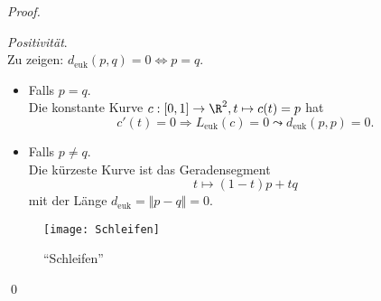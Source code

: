 \begin{theorem}
\begin{proof}
\begin{itemize}
      \begin{minipage}{.45\textwidth}
        \item \emph{Positivität}. \\
          Zu zeigen: \( d_\text{euk}(p,q) = 0 \Leftrightarrow p = q \).
          \begin{itemize}
            \item Falls \( p = q \). \\
              Die konstante Kurve \( c: [0,1] \to \R^2, t \mapsto c(t) = p \) hat 
              \begin{equation*}
                c'(t) = 0 \Rightarrow L_\text{euk}(c) = 0 \leadsto d_\text{euk}(p,p) = 0 \text{.}
              \end{equation*}
            \item Falls \( p \neq q \). \\
              Die kürzeste Kurve ist das Geradensegment\footnotemark{}
              \begin{equation*}
                t \mapsto (1-t)p + tq
              \end{equation*}
              mit der Länge \( d_\text{euk} = \Vert p - q \Vert = 0 \).
          \end{itemize}
      \end{minipage}
      \hfill
      \begin{minipage}{.45\textwidth}
        \begin{figure}[H]
          \texttt{[image: Schleifen]}
          \caption{``Schleifen''}
        \end{figure}
      \end{minipage}
    \end{itemize} \qed{}
  \end{proof}
\end{theorem}

